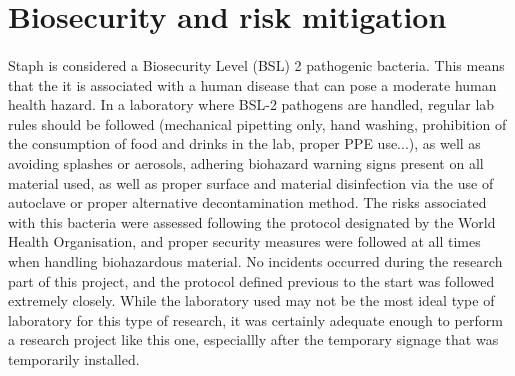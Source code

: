 \section{Biosecurity and risk mitigation}
\paragraph{}Staph is considered a Biosecurity Level (BSL) 2 pathogenic bacteria\cite{cheungPathogenicityVirulenceStaphylococcus2021}. This means that the it is associated with a human disease that can pose a moderate human health hazard. In a laboratory where BSL-2 pathogens are handled, regular lab rules should be followed (mechanical pipetting only, hand washing, prohibition of the consumption of food and drinks in the lab, proper PPE use...), as well as avoiding splashes or aerosols, adhering biohazard warning signs present on all material used, as well as proper surface and material disinfection via the use of autoclave or proper alternative decontamination method\cite{worldhealthorganizationLaboratoryBiosafetyManual2020}.\newline
The risks associated with this bacteria were assessed following the protocol designated by the World Health Organisation\cite{worldhealthorganizationLaboratoryBiosafetyManual2020}, and proper security measures were followed at all times when handling biohazardous material. No incidents occurred during the research part of this project, and the protocol defined previous to the start was followed extremely closely. While the laboratory used may not be the most ideal type of laboratory for this type of research, it was certainly adequate enough to perform a research project like this one, especiallly after the temporary signage that was temporarily installed.
